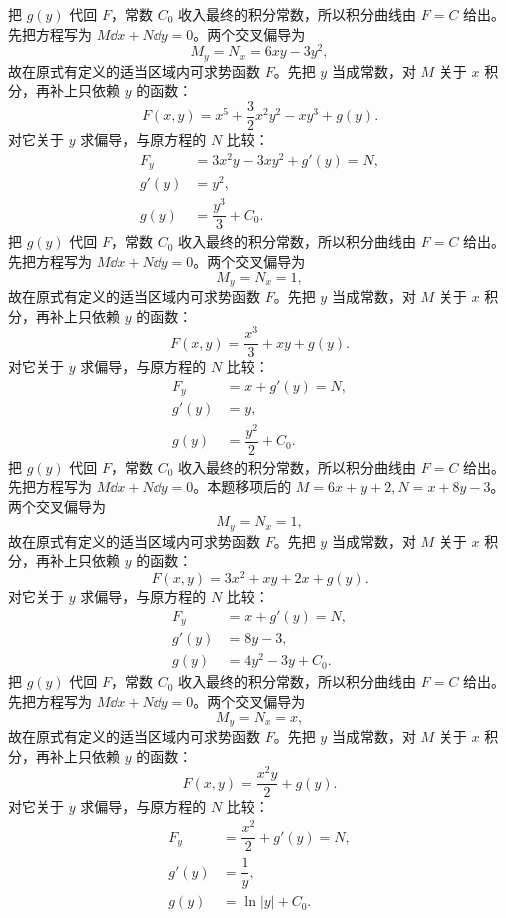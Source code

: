 把 $g(y)$ 代回 $F$，常数 $C_0$ 收入最终的积分常数，所以积分曲线由 $F=C$ 给出。
先把方程写为 $M\dd x+N\dd y=0$。两个交叉偏导为
\[
M_y=N_x=6xy-3y^2,
\]
故在原式有定义的适当区域内可求势函数 $F$。先把 $y$ 当成常数，对 $M$ 关于 $x$ 积分，再补上只依赖 $y$ 的函数：
\[
F(x,y)=x^5+\dfrac32x^2y^2-xy^3+g(y).
\]
对它关于 $y$ 求偏导，与原方程的 $N$ 比较：
\[
\begin{aligned}
F_y&=3x^2y-3xy^2+g'(y)=N,\\
g'(y)&=y^2,\\
g(y)&=\dfrac{y^3}{3}+C_0.
\end{aligned}
\]
把 $g(y)$ 代回 $F$，常数 $C_0$ 收入最终的积分常数，所以积分曲线由 $F=C$ 给出。
先把方程写为 $M\dd x+N\dd y=0$。两个交叉偏导为
\[
M_y=N_x=1,
\]
故在原式有定义的适当区域内可求势函数 $F$。先把 $y$ 当成常数，对 $M$ 关于 $x$ 积分，再补上只依赖 $y$ 的函数：
\[
F(x,y)=\dfrac{x^3}{3}+xy+g(y).
\]
对它关于 $y$ 求偏导，与原方程的 $N$ 比较：
\[
\begin{aligned}
F_y&=x+g'(y)=N,\\
g'(y)&=y,\\
g(y)&=\dfrac{y^2}{2}+C_0.
\end{aligned}
\]
把 $g(y)$ 代回 $F$，常数 $C_0$ 收入最终的积分常数，所以积分曲线由 $F=C$ 给出。
先把方程写为 $M\dd x+N\dd y=0$。本题移项后的 $M=6x+y+2,N=x+8y-3$。两个交叉偏导为
\[
M_y=N_x=1,
\]
故在原式有定义的适当区域内可求势函数 $F$。先把 $y$ 当成常数，对 $M$ 关于 $x$ 积分，再补上只依赖 $y$ 的函数：
\[
F(x,y)=3x^2+xy+2x+g(y).
\]
对它关于 $y$ 求偏导，与原方程的 $N$ 比较：
\[
\begin{aligned}
F_y&=x+g'(y)=N,\\
g'(y)&=8y-3,\\
g(y)&=4y^2-3y+C_0.
\end{aligned}
\]
把 $g(y)$ 代回 $F$，常数 $C_0$ 收入最终的积分常数，所以积分曲线由 $F=C$ 给出。
先把方程写为 $M\dd x+N\dd y=0$。两个交叉偏导为
\[
M_y=N_x=x,
\]
故在原式有定义的适当区域内可求势函数 $F$。先把 $y$ 当成常数，对 $M$ 关于 $x$ 积分，再补上只依赖 $y$ 的函数：
\[
F(x,y)=\dfrac{x^2y}{2}+g(y).
\]
对它关于 $y$ 求偏导，与原方程的 $N$ 比较：
\[
\begin{aligned}
F_y&=\dfrac{x^2}{2}+g'(y)=N,\\
g'(y)&=\dfrac1y,\\
g(y)&=\ln|y|+C_0.
\end{aligned}
\]

